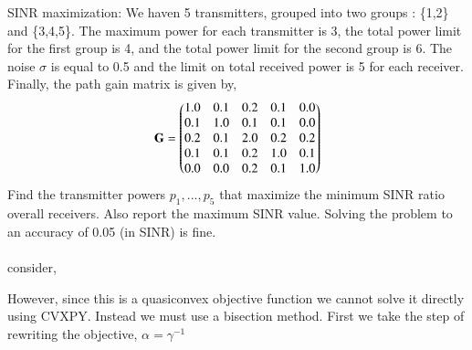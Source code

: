 \documentclass[journal,12pt,twocolumn]{IEEEtran}
\begin{document}
\begin{enumerate}
SINR maximization: We haven 5 transmitters, grouped into two groups : \{1,2\} and \{3,4,5\}. The maximum power for each transmitter is 3, the total  power limit for the first group is 4, and the total power limit for the second group is 6. The noise $\sigma$ is equal to 0.5 and the limit on total received power is 5 for each receiver. Finally, the path gain matrix is given by, \begin{align} \mathbf{G} =\begin{pmatrix}1.0&0.1&0.2&0.1&0.0\\0.1&1.0&0.1&0.1&0.0\\0.2&0.1&2.0&0.2&0.2\\0.1&0.1&0.2&1.0&0.1\\0.0&0.0&0.2&0.1&1.0\end{pmatrix}\nonumber \end{align}
Find the transmitter powers $p_1,...,p_5$ that maximize the minimum SINR ratio overall receivers. Also report the maximum SINR value. Solving the problem to an accuracy of 0.05 (in SINR) is fine.\\
\solution \\
consider,
 \begin{table}[H]
 \centering
 \caption{}
 \end{table}
 However, since this is a quasiconvex objective function we cannot solve it directly using CVXPY. Instead we must use a bisection method. First we take the step of rewriting the objective, $\alpha =\gamma^{-1}$\\

\end{enumerate}
\end{document}
